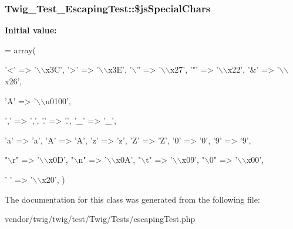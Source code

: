 \subsubsection[{\texorpdfstring{\$js\+Special\+Chars}{$jsSpecialChars}}]{\setlength{\rightskip}{0pt plus 5cm}Twig\+\_\+\+Test\+\_\+\+Escaping\+Test\+::\$js\+Special\+Chars\hspace{0.3cm}{\ttfamily [protected]}}\hypertarget{classTwig__Test__EscapingTest_a0c4ecb1b3383b6ae38f4a3e860d6b6cb}{}\label{classTwig__Test__EscapingTest_a0c4ecb1b3383b6ae38f4a3e860d6b6cb}
{\bfseries Initial value\+:}
\begin{DoxyCode}
= array(
        
        \textcolor{charliteral}{'<'} => \textcolor{stringliteral}{'\(\backslash\)\(\backslash\)x3C'},
        \textcolor{charliteral}{'>'} => \textcolor{stringliteral}{'\(\backslash\)\(\backslash\)x3E'},
        \textcolor{charliteral}{'\(\backslash\)''} => \textcolor{stringliteral}{'\(\backslash\)\(\backslash\)x27'},
        \textcolor{charliteral}{'"'} => \textcolor{stringliteral}{'\(\backslash\)\(\backslash\)x22'},
        \textcolor{charliteral}{'&'} => \textcolor{stringliteral}{'\(\backslash\)\(\backslash\)x26'},
        
        \textcolor{stringliteral}{'Ā'} => \textcolor{stringliteral}{'\(\backslash\)\(\backslash\)u0100'},
        
        \textcolor{charliteral}{','} => \textcolor{charliteral}{','},
        \textcolor{charliteral}{'.'} => \textcolor{charliteral}{'.'},
        \textcolor{charliteral}{'\_'} => \textcolor{charliteral}{'\_'},
        
        \textcolor{charliteral}{'a'} => \textcolor{charliteral}{'a'},
        \textcolor{charliteral}{'A'} => \textcolor{charliteral}{'A'},
        \textcolor{charliteral}{'z'} => \textcolor{charliteral}{'z'},
        \textcolor{charliteral}{'Z'} => \textcolor{charliteral}{'Z'},
        \textcolor{charliteral}{'0'} => \textcolor{charliteral}{'0'},
        \textcolor{charliteral}{'9'} => \textcolor{charliteral}{'9'},
        
        \textcolor{stringliteral}{"\(\backslash\)r"} => \textcolor{stringliteral}{'\(\backslash\)\(\backslash\)x0D'},
        \textcolor{stringliteral}{"\(\backslash\)n"} => \textcolor{stringliteral}{'\(\backslash\)\(\backslash\)x0A'},
        \textcolor{stringliteral}{"\(\backslash\)t"} => \textcolor{stringliteral}{'\(\backslash\)\(\backslash\)x09'},
        \textcolor{stringliteral}{"\(\backslash\)0"} => \textcolor{stringliteral}{'\(\backslash\)\(\backslash\)x00'},
        
        \textcolor{charliteral}{' '} => \textcolor{stringliteral}{'\(\backslash\)\(\backslash\)x20'},
    )
\end{DoxyCode}


The documentation for this class was generated from the following file\+:\begin{DoxyCompactItemize}
\item 
vendor/twig/twig/test/\+Twig/\+Tests/escaping\+Test.\+php\end{DoxyCompactItemize}
